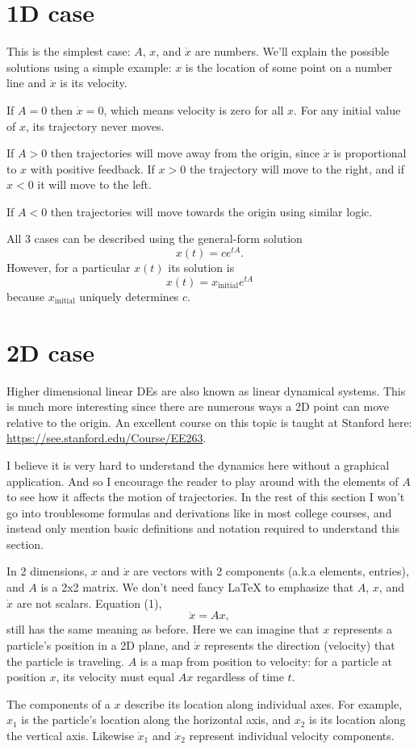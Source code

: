 \documentclass[11pt, oneside]{article}   	%
\begin{document}
\section{1D case}

This is the simplest case: $A$, $x$, and $\dot{x}$ are numbers.
We'll explain the possible solutions using a simple example: $x$ is the location of some point on a number line and $\dot{x}$ is its velocity.

If $A = 0$ then $\dot{x} = 0$, which means velocity is zero for all $x$.
For any initial value of $x$, its trajectory never moves.

If $A > 0$ then trajectories will move away from the origin, since $\dot{x}$ is proportional to $x$ with positive feedback.
If $x > 0$ the trajectory will move to the right, and if $x < 0$ it will move to the left.

If $A < 0$ then trajectories will move towards the origin using similar logic.

All 3 cases can be described using the general-form solution
\begin{equation}
x(t) = ce^{tA} .
\end{equation}
However, for a particular $x(t)$ its solution is
\begin{equation}
x(t) = x_\mathrm{initial} e^{tA}
\end{equation}
because $x_\mathrm{initial}$ uniquely determines $c$.


\section{2D case}

Higher dimensional linear DEs are also known as linear dynamical systems.
This is much more interesting since there are numerous ways a 2D point can move relative to the origin.
An excellent course on this topic is taught at Stanford here: \url{https://see.stanford.edu/Course/EE263}.

I believe it is very hard to understand the dynamics here without a graphical application.
And so I encourage the reader to play around with the elements of $A$ to see how it affects the motion of trajectories.
In the rest of this section I won't go into troublesome formulas and derivations like in most college courses,
and instead only mention basic definitions and notation required to understand this section.

In 2 dimensions, $x$ and $\dot{x}$ are vectors with 2 components (a.k.a elements, entries), and $A$ is a 2x2 matrix.
We don't need fancy LaTeX to emphasize that $A$, $x$, and $\dot{x}$ are not scalars.
Equation (1),
$$ \dot{x} = Ax ,$$
still has the same meaning as before.
Here we can imagine that $x$ represents a particle's position in a 2D plane,
and $\dot{x}$ represents the direction (velocity) that the particle is traveling.
$A$ is a map from position to velocity: for a particle at position $x$, its velocity must equal $Ax$ regardless of time $t$.

The components of a $x$ describe its location along individual axes.
For example, $x_1$ is the particle's location along the horizontal axis,
and $x_2$ is its location along the vertical axis.
Likewise $\dot{x}_1$ and $\dot{x}_2$ represent individual velocity components.
\end{document}

